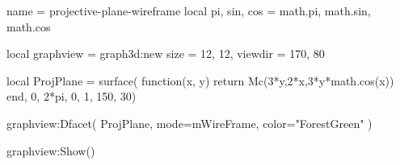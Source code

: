 \documentclass{standalone}
\begin{document}
\begin{luadraw}{name = projective-plane-wireframe}
local pi, sin, cos = math.pi, math.sin, math.cos

local graphview = graph3d:new{
  size    = {12, 12},
  viewdir = {170, 80}
}

local ProjPlane =  surface(
  function(x, y) 
    return Mc(3*y,2*x,3*y*math.cos(x))
  end, 
  0, 2*pi, 0, 1, 
  {150, 30})

graphview:Dfacet(
  ProjPlane, 
  {
    mode=mWireFrame, 
    color="ForestGreen"
  })

graphview:Show()
\end{luadraw}
\end{document}
